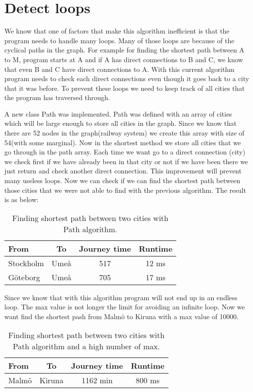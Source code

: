\documentclass[a4paper,11pt]{article}
\begin{document}
\section*{Detect loops}
We know that one of factors that make this algorithm inefficient is that the program needs to handle many loops. Many of those loops are because of the cyclical paths in the graph. For example for finding the shortest path between A to M, program starts at A and if A has direct connections to B and C, we know that even B and C have direct connections to A. With this current algorithm program needs to check each direct connections even though it goes back to a city that it was before. To prevent these loops we need to keep track of all cities that the program has traversed through.\newline

A new class Path was implemented. Path was defined with an array of cities which will be large enough to store all cities in the graph. Since we know that there are 52 nodes in the graph(railway system) we create this array with size of 54(with some marginal). Now in the shortest method we store all cities that we go through in the path array. Each time we want go to a direct connection (city) we check first if we have already been in that city or not if we have been there we just return and check another direct connection. This improvement will prevent many useless loops. Now we can check if we can find the shortest path between those cities that we were not able to find with the previous algorithm. The result is as below:\newline

  \begin{table}[h]
\begin{center}
\begin{tabular}{l|c|c|c}
\textbf{From} & \textbf{To} & \textbf{Journey time} & \textbf{Runtime}\\
\hline
Stockholm  &Umeå &517 &12 ms \\
Göteborg  &Umeå &705 & 17 ms\\
\end{tabular}
\caption{Finding shortest path between two cities with Path algorithm.}
\label{tab:table1}
\end{center}
\end{table}\newlin

Since we know that with this algorithm program will not end up in an endless loop. The max value is not longer the limit for avoiding an infinite loop. Now we want find the shortest pash from Malmö to Kiruna with a max value of 10000. 
 \begin{table}[h]
\begin{center}
\begin{tabular}{l|c|c|c}
\textbf{From} & \textbf{To} & \textbf{Journey time} & \textbf{Runtime}\\
\hline
Malmö  &Kiruna &1162 min &800 ms \\
\end{tabular}
\caption{Finding shortest path between two cities with Path algorithm and a high number of max.}
\label{tab:table1}
\end{center}
\end{table}\newlin
\end{document}
